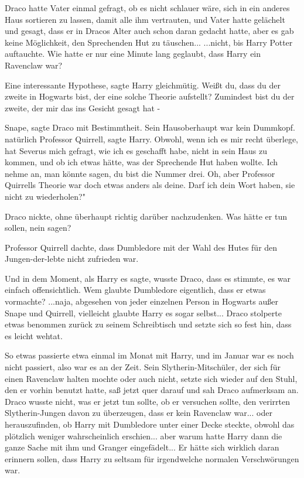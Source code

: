 Draco hatte Vater einmal gefragt, ob es nicht schlauer wäre, sich in ein anderes
Haus sortieren zu lassen, damit alle ihm vertrauten, und Vater hatte gelächelt
und gesagt, dass er in Dracos Alter auch schon daran gedacht hatte, aber es gab
keine Möglichkeit, den Sprechenden Hut zu täuschen... ...nicht, bis Harry Potter
auftauchte. Wie hatte er nur eine Minute lang geglaubt, dass Harry ein Ravenclaw
war?

\glqq{}Eine interessante Hypothese\grqq{}, sagte Harry gleichmütig. \glqq{}Weißt
du, dass du der zweite in Hogwarts bist, der eine solche Theorie aufstellt?
Zumindest bist du der zweite, der mir das ins Gesicht gesagt hat -\grqq{}

\glqq{}Snape\grqq{}, sagte Draco mit Bestimmtheit. Sein Hausoberhaupt war kein
Dummkopf. \glqq{}natürlich Professor Quirrell\grqq{}, sagte Harry. \glqq{}Obwohl,
wenn ich es mir recht überlege, hat Severus mich gefragt, wie ich es geschafft
habe, nicht in sein Haus zu kommen, und ob ich etwas hätte, was der Sprechende
Hut haben wollte. Ich nehme an, man könnte sagen, du bist die Nummer drei. Oh,
aber Professor Quirrells Theorie war doch etwas anders als deine. Darf ich dein
Wort haben, sie nicht zu wiederholen?"

Draco nickte, ohne überhaupt richtig darüber nachzudenken. Was hätte er tun
sollen, nein sagen?

\glqq{}Professor Quirrell dachte, dass Dumbledore mit der Wahl des Hutes für den
Jungen-der-lebte nicht zufrieden war.\grqq{}

Und in dem Moment, als Harry es sagte, wusste Draco, dass es stimmte, es war
einfach offensichtlich. Wem glaubte Dumbledore eigentlich, dass er etwas
vormachte? ...naja, abgesehen von jeder einzelnen Person in Hogwarts außer Snape
und Quirrell, vielleicht glaubte Harry es sogar selbst... Draco stolperte etwas
benommen zurück zu seinem Schreibtisch und setzte sich so fest hin, dass es
leicht wehtat.

So etwas passierte etwa einmal im Monat mit Harry, und im Januar war es noch
nicht passiert, also war es an der Zeit. Sein Slytherin-Mitschüler, der sich für
einen Ravenclaw halten mochte oder auch nicht, setzte sich wieder auf den Stuhl,
den er vorhin benutzt hatte, saß jetzt quer darauf und sah Draco aufmerksam an.
Draco wusste nicht, was er jetzt tun sollte, ob er versuchen sollte, den
verirrten Slytherin-Jungen davon zu überzeugen, dass er kein Ravenclaw war...
oder herauszufinden, ob Harry mit Dumbledore unter einer Decke steckte, obwohl
das plötzlich weniger wahrscheinlich erschien... aber warum hatte Harry dann die
ganze Sache mit ihm und Granger eingefädelt... Er hätte sich wirklich daran
erinnern sollen, dass Harry zu seltsam für irgendwelche normalen Verschwörungen
war.


